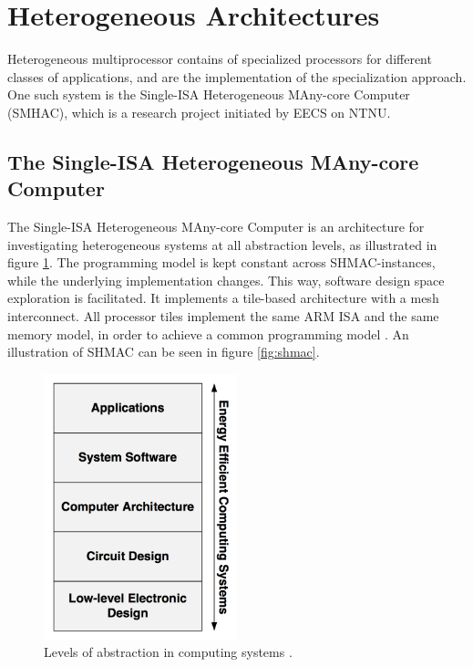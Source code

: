 \section{Heterogeneous Architectures}
\label{sec:heterogeneous}
Heterogeneous multiprocessor contains of specialized processors for different classes of applications, and are the implementation of the specialization approach.
One such system is the Single-ISA Heterogeneous MAny-core Computer (SMHAC), which is a research project 
initiated by EECS on NTNU. \cite{shmac-plan}

\subsection{The Single-ISA Heterogeneous MAny-core Computer}
\label{sec:shmac}
The Single-ISA Heterogeneous MAny-core Computer is an architecture for investigating heterogeneous systems at all abstraction levels, as illustrated in figure \ref{fig:shmacAbstractionLevels}.
The programming model is kept constant across SHMAC-instances, while the underlying implementation changes.
This way, software design space exploration is facilitated.
It implements a tile-based architecture with a mesh interconnect. All processor tiles implement the same
ARM ISA and the same memory model, in order to achieve a common programming model \cite{shmac-plan}.
An illustration of SHMAC can be seen in figure \ref{fig:shmac}.

\begin{figure}[htb]
    \centering
    \includegraphics[width=0.5\textwidth]{Figures/Heterogeneous/SHMACAbstractionLevels}
    \caption{Levels of abstraction in computing systems \cite{shmac-plan}.}
    \label{fig:shmacAbstractionLevels}
\end{figure}

